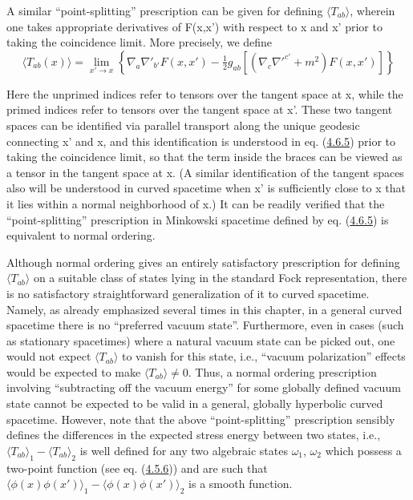 \documentclass[11pt,a4paper]{article}
\begin{document}
A similar ``point-splitting'' prescription can be given for defining \(\langle T_{ab}\rangle \), wherein one takes appropriate derivatives of F(x,x') with respect to x and x' prior to taking the coincidence limit. More precisely, we define
\begin{equation*}
\langle T_{ab}(x)\rangle =\lim_{x'\to x} \left\{ \nabla_a \nabla'_{b'} F(x,x') - \tfrac{1}{2} g_{ab} [(\nabla_c \nabla'^{c'} + m^2) F(x,x')] \right\} \tag{4.6.5}\label{eq:4.6.5}
\end{equation*}

Here the unprimed indices refer to tensors over the tangent space at x, while the primed indices refer to tensors over the tangent space at x'. These two tangent spaces can be identified via parallel transport along the unique geodesic connecting x' and x, and this identification is understood in eq. (\hyperref[eq:4.6.5]{4.6.5}) prior to taking the coincidence limit, so that the term inside the braces can be viewed as a tensor in the tangent space at x. (A similar identification of the tangent spaces also will be understood in curved spacetime when x' is sufficiently close to x that it lies within a normal neighborhood of x.) It can be readily verified that the ``point-splitting'' prescription in Minkowski spacetime defined by eq. (\hyperref[eq:4.6.5]{4.6.5}) is equivalent to normal ordering.

Although normal ordering gives an entirely satisfactory prescription for defining \(\langle T_{ab}\rangle\) on a suitable class of states lying in the standard Fock representation, there is no satisfactory straightforward generalization of it to curved spacetime. Namely, as already emphasized several times in this chapter, in a general curved spacetime there is no ``preferred vacuum state''. Furthermore, even in cases (such as stationary spacetimes) where a natural vacuum state can be picked out, one would not expect \(\langle T_{ab}\rangle\) to vanish for this state, i.e., ``vacuum polarization'' effects would be expected to make \(\langle T_{ab}\rangle\ne0\). Thus, a normal ordering prescription involving ``subtracting off the vacuum energy'' for some globally defined vacuum state cannot be expected to be valid in a general, globally hyperbolic curved spacetime. However, note that the above ``point-splitting'' prescription sensibly defines the differences in the expected stress energy between two states, i.e., \(\langle T_{ab}\rangle _1-\langle T_{ab}\rangle _2\) is well defined for any two algebraic states \(\omega_1\), \(\omega_2\) which possess a two-point function (see eq. (\hyperref[eq:4.5.6]{4.5.6})) and are such that \(\langle \phi(x)\phi(x')\rangle_1 - \langle \phi(x)\phi(x')\rangle_2\) is a smooth function.
\end{document}
